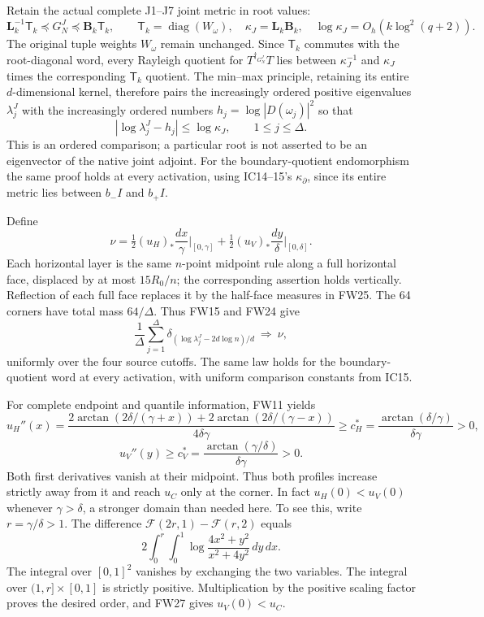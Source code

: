 \documentclass[11pt]{article}
\begin{document}
Retain the actual complete J1--J7 joint metric in root values: \[
\mathbf L_k^{-1}\mathsf T_k\preceq G_N^J\preceq\mathbf B_k\mathsf T_k,
\qquad \mathsf T_k=\operatorname{diag}(W_\omega),\quad
\kappa_J=\mathbf L_k\mathbf B_k,\quad \log\kappa_J=O_h(k\log^2(q+2)).
\tag{FW23}
\] The original tuple weights \(W_\omega\) remain unchanged. Since \(\mathsf T_k\) commutes with the root-diagonal word, every Rayleigh quotient for \(T^{\dagger_{G_N^J}}T\) lies between \(\kappa_J^{-1}\) and \(\kappa_J\) times the corresponding \(\mathsf T_k\) quotient. The min--max principle, retaining its entire \(d\)-dimensional kernel, therefore pairs the increasingly ordered positive eigenvalues \(\lambda_j^J\) with the increasingly ordered numbers \(h_j=\log|D(\omega_j)|^2\) so that \[
|\log\lambda_j^J-h_j|\le\log\kappa_J,\qquad 1\le j\le\Delta.
\tag{FW24}
\] This is an ordered comparison; a particular root is not asserted to be an eigenvector of the native joint adjoint. For the boundary-quotient endomorphism the same proof holds at every activation, using IC14--15's \(\kappa_\partial\), since its entire metric lies between \(b_-I\) and \(b_+I\).

Define \[
\nu=\tfrac12(u_H)_*\frac{dx}{\gamma}\bigg|_{[0,\gamma]}
+\tfrac12(u_V)_*\frac{dy}{\delta}\bigg|_{[0,\delta]}.
\tag{FW25}
\] Each horizontal layer is the same \(n\)-point midpoint rule along a full horizontal face, displaced by at most \(15R_0/n\); the corresponding assertion holds vertically. Reflection of each full face replaces it by the half-face measures in FW25. The 64 corners have total mass \(64/\Delta\). Thus FW15 and FW24 give \[
\frac1\Delta\sum_{j=1}^\Delta\delta_{(\log\lambda_j^J-2d\log n)/d}\ \Longrightarrow\ \nu,
\tag{FW26}
\] uniformly over the four source cutoffs. The same law holds for the boundary-quotient word at every activation, with uniform comparison constants from IC15.

For complete endpoint and quantile information, FW11 yields \[
u_H''(x)=\frac{2\arctan(2\delta/(\gamma+x))+2\arctan(2\delta/(\gamma-x))}{4\delta\gamma}
\ge c_H^*=\frac{\arctan(\delta/\gamma)}{\delta\gamma}>0,
\] \[
u_V''(y)\ge c_V^*=\frac{\arctan(\gamma/\delta)}{\delta\gamma}>0.
\tag{FW27}
\] Both first derivatives vanish at their midpoint. Thus both profiles increase strictly away from it and reach \(u_C\) only at the corner. In fact \(u_H(0)<u_V(0)\) whenever \(\gamma>\delta\), a stronger domain than needed here. To see this, write \(r=\gamma/\delta>1\). The difference \(\mathscr F(2r,1)-\mathscr F(r,2)\) equals \[
2\int_0^r\int_0^1\log\frac{4x^2+y^2}{x^2+4y^2}\,dy\,dx.
\] The integral over \([0,1]^2\) vanishes by exchanging the two variables. The integral over \((1,r]\times[0,1]\) is strictly positive. Multiplication by the positive scaling factor proves the desired order, and FW27 gives \(u_V(0)<u_C\).
\end{document}
